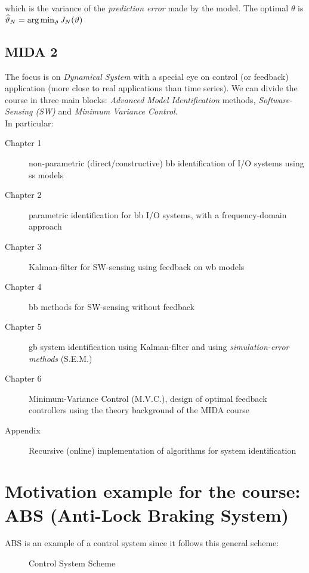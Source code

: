 which is the variance of the \emph{prediction error} made by the model. The optimal $\theta$ is $\widehat{\vartheta}_N = \operatorname*{arg\,min}_\vartheta J_{N}(\vartheta)$

\subsection{MIDA 2}

The focus is on \emph{Dynamical System} with a special eye on control (or feedback) application (more close to real applications than time series). We can divide the course in three main blocks: \emph{Advanced Model Identification} methods, \emph{Software-Sensing (SW)} and \emph{Minimum Variance Control}.\\
In particular: 

\begin{description}
    \item[Chapter 1] non-parametric (direct/constructive) \gls{bb} identification of I/O systems using \acrlong{ss} models
    \item[Chapter 2] parametric identification for \gls{bb} I/O systems, with a frequency-domain approach
    \item[Chapter 3] Kalman-filter for SW-sensing using feedback on \gls{wb} models
    \item[Chapter 4] \gls{bb} methods for SW-sensing without feedback
    \item[Chapter 5] \gls{gb} system identification using Kalman-filter and using \emph{simulation-error methods} (S.E.M.)
    \item[Chapter 6] Minimum-Variance Control (M.V.C.), design of optimal feedback controllers using the theory background of the MIDA course
    \item[Appendix] Recursive (online) implementation of algorithms for system identification
\end{description}

\section{Motivation example for the course: ABS (Anti-Lock Braking System)} \label{abs_ex}
ABS is an example of a control system since it follows this general scheme:
\begin{figure}[H]
    \centering
	\caption*{Control System Scheme}
\end{figure}
    
